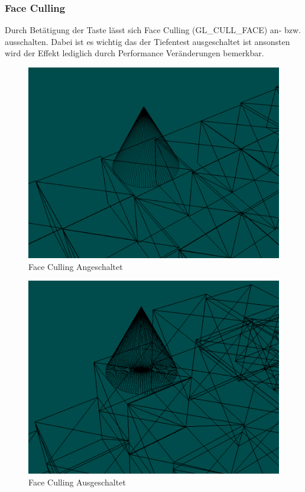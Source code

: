 \documentclass{article}
\begin{document}
\subsubsection{Face Culling}
Durch Betätigung der Taste  lässt sich Face Culling (GL\_CULL\_FACE)
an- bzw. ausschalten. Dabei ist es wichtig das der Tiefentest ausgeschaltet ist ansonsten wird der
Effekt lediglich durch Performance Veränderungen bemerkbar.\\
\begin{minipage}{0.5\textwidth}
\begin{figure}[H]
    \centering
    \includegraphics[scale=0.18]{omode3.png}
    \caption{Face Culling Angeschaltet}
\end{figure}
\end{minipage}
\begin{minipage}{0.5\textwidth}
\begin{figure}[H]
    \centering
    \includegraphics[scale=0.19]{omode4.png}
    \caption{Face Culling Ausgeschaltet}
\end{figure}
\end{minipage}
\end{document}
